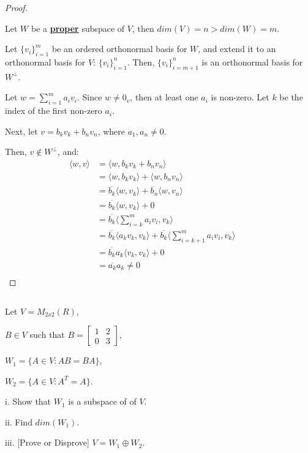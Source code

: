 \documentclass{article}
\newenvironment{customthm}[1]
  {\renewcommand\theinnercustomthm{#1}\innercustomthm}
  {\endinnercustomthm}
\begin{document}
\begin{proof}
  $ $

  Let $W$ be a \textbf{\underline{proper}} subspace of $V$, then $dim(V) = n > dim(W) = m$. 
  
  Let $\{ v_i \}_{i = 1}^{m}$ be an ordered orthonormal basis for $W$, and extend it to an orthonormal basis for $V$: $\{ v_i \}_{i = 1}^{n}$.
  Then, $\{ v_i \}_{i = m+1}^{n}$ is an orthonormal basis for $W^\perp$.
  \newline

  Let $w = \sum_{i = 1}^{m} a_iv_i$. Since $w \neq 0_v$, then at least one $a_i$ is non-zero. Let $k$ be the index of the first non-zero $a_i$.

  Next, let $v = b_kv_k + b_nv_n$, where $a_1, a_n \neq 0$.
  
  Then, $v \notin W^\perp$, and:
  \begin{align*}
    \langle
      w, v
    \rangle 
    &=
    \langle
      w, b_kv_k + b_nv_n
    \rangle &&\\
    &=
    \langle
      w, b_kv_k
    \rangle
    +
    \langle
      w, b_nv_n
    \rangle &&\\
    &=
    \overline{b_k}
    \langle
      w, v_k
    \rangle
    +
    \overline{b_n}
    \langle
      w, v_n
    \rangle &&\\
    &=
    \overline{b_k}
    \langle
      w, v_k
    \rangle
    +
    0 &&\\
    &=
    \overline{b_k}
    \langle
      \sum_{i=k}^{m} a_iv_i, v_k
    \rangle &&\\
    &=
    \overline{b_k}
    \langle
      a_kv_k, v_k
    \rangle
    +
    \overline{b_k}
    \langle
      \sum_{i=k+1}^{m} a_iv_i, v_k
    \rangle &&\\
    &=
    \overline{b_k}a_k
    \langle
      v_k, v_k
    \rangle
    +
    0 &&\\
    &=
    \overline{a_k}a_k \neq 0 &&\\
  \end{align*}

\end{proof}
\newpage


\begin{customthm}{21}[2012.F(1.B)]
  $ $

  Let $V = M_{2x2}(R)$, 
  
  $B \in V$ such that $B=\begin{bmatrix}
    1 & 2 \\
    0 & 3
  \end{bmatrix}
  $, 
  
  $W_1 = \{ A \in V: AB=BA \}$,

  $W_2 = \{ A \in V: A^T = A \}$.


  i. Show that $W_1$ is a subspace of of $V$.

  ii. Find $dim(W_1)$.

  iii. [Prove or Disprove] $V = W_1 \oplus W_2$.
\end{customthm}
\end{document}
